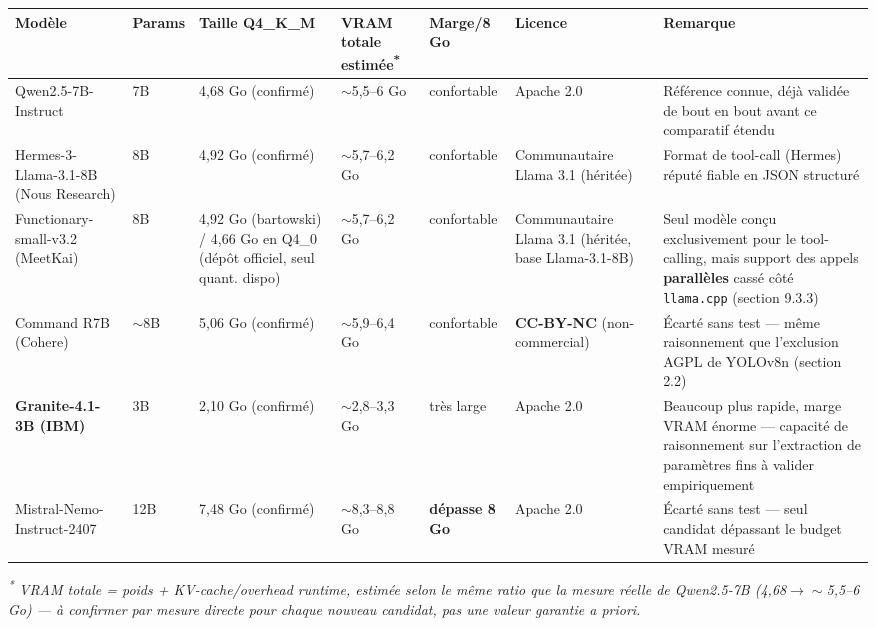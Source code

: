 \documentclass[11pt,a4paper]{article}
\begin{document}
    \begin{landscape}
    \begin{table}[p]
    \centering
    \footnotesize
    \renewcommand{\arraystretch}{1.25}
    \begin{adjustbox}{max width=\linewidth}
    \begin{tabular}{@{}p{3.6cm}p{1.2cm}p{2.0cm}p{2.4cm}p{2.0cm}p{3.4cm}p{7.0cm}@{}}
    \toprule
    \textbf{Modèle} & \textbf{Params} & \textbf{Taille Q4\_K\_M} & \textbf{VRAM totale estimée\textsuperscript{*}} & \textbf{Marge/8 Go} & \textbf{Licence} & \textbf{Remarque} \\
    \midrule
    Qwen2.5-7B-Instruct & 7B & 4,68 Go (confirmé) & $\sim$5,5--6 Go & confortable & Apache 2.0 & Référence connue, déjà validée de bout en bout avant ce comparatif étendu \\
    Hermes-3-Llama-3.1-8B (Nous Research) & 8B & 4,92 Go (confirmé) & $\sim$5,7--6,2 Go & confortable & Communautaire Llama 3.1 (héritée) & Format de tool-call (Hermes) réputé fiable en JSON structuré \\
    Functionary-small-v3.2 (MeetKai) & 8B & 4,92 Go (bartowski) / 4,66 Go en Q4\_0 (dépôt officiel, seul quant. dispo) & $\sim$5,7--6,2 Go & confortable & Communautaire Llama 3.1 (héritée, base Llama-3.1-8B) & Seul modèle conçu exclusivement pour le tool-calling, mais support des appels \textbf{parallèles} cassé côté \texttt{llama.cpp} (section 9.3.3) \\
    Command R7B (Cohere) & $\sim$8B & 5,06 Go (confirmé) & $\sim$5,9--6,4 Go & confortable & \textbf{CC-BY-NC} (non-commercial) & Écarté sans test --- même raisonnement que l'exclusion AGPL de YOLOv8n (section 2.2) \\
    \textbf{Granite-4.1-3B (IBM)} & 3B & 2,10 Go (confirmé) & $\sim$2,8--3,3 Go & très large & Apache 2.0 & Beaucoup plus rapide, marge VRAM énorme --- capacité de raisonnement sur l'extraction de paramètres fins à valider empiriquement \\
    Mistral-Nemo-Instruct-2407 & 12B & 7,48 Go (confirmé) & $\sim$8,3--8,8 Go & \textbf{dépasse 8 Go} & Apache 2.0 & Écarté sans test --- seul candidat dépassant le budget VRAM mesuré \\
    \bottomrule
    \end{tabular}
    \end{adjustbox}
    
    \vspace{0.6em}
    \raggedright
    \textit{\footnotesize\textsuperscript{*} VRAM totale = poids + KV-cache/overhead runtime, estimée selon le
    même ratio que la mesure réelle de Qwen2.5-7B (4,68$\to\sim$5,5--6 Go) ---
    à confirmer par mesure directe pour chaque nouveau candidat, pas une
    valeur garantie a priori.}
    \end{table}
    \end{landscape}
    
\end{document}
